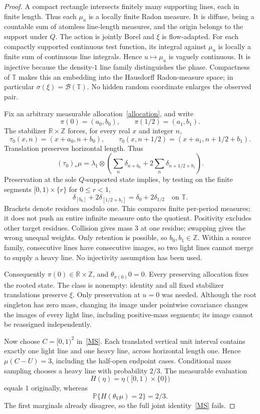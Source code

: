 \documentclass[11pt]{article}
\newcommand{\R}{\mathbb R}
\newcommand{\Z}{\mathbb Z}
\newcommand{\T}{\mathbb T}
\begin{document}
\begin{proof}
A compact rectangle intersects finitely many supporting lines, each in finite length. Thus each $\mu_u$ is a locally finite Radon measure. It is diffuse, being a countable sum of atomless line-length measures, and the origin belongs to the support under $Q$. The action is jointly Borel and $\xi$ is flow-adapted. For each compactly supported continuous test function, its integral against $\mu_u$ is locally a finite sum of continuous line integrals. Hence $u\mapsto\mu_u$ is vaguely continuous. It is injective because the density-$1$ line family distinguishes the phase. Compactness of $\T$ makes this an embedding into the Hausdorff Radon-measure space; in particular $\sigma(\xi)=\mathcal B(\T)$. No hidden random coordinate enlarges the observed pair.

Fix an arbitrary measurable allocation~\eqref{allocation}, and write
\[
 \pi(0)=(a_0,b_0),\qquad \pi(1/2)=(a_1,b_1).
\]
The stabilizer $\R\times\Z$ forces, for every real $x$ and integer $n$,
\[
 \tau_0(x,n)=(x+a_0,n+b_0),\qquad
 \tau_0(x,n+1/2)=(x+a_1,n+1/2+b_1).
\]
Translation preserves horizontal length. Thus
\[
 (\tau_0)_*\mu=\lambda_1\otimes
 \left(\sum_n\delta_{n+b_0}+2\sum_n\delta_{n+1/2+b_1}\right).
\]
Preservation at the sole $Q$-supported state implies, by testing on the finite segments $[0,1)\times\{r\}$ for $0\le r<1$,
\begin{equation}\label{quotient}
 \delta_{[b_0]}+2\delta_{[1/2+b_1]}
   =\delta_0+2\delta_{1/2}\quad\text{on }\T.
\end{equation}
Brackets denote residues modulo one. This compares finite per-period measures; it does not push an entire infinite measure onto the quotient. Positivity excludes other target residues. Collision gives mass $3$ at one residue; swapping gives the wrong unequal weights. Only retention is possible, so $b_0,b_1\in\Z$. Within a source family, consecutive lines have consecutive images, so two light lines cannot merge to supply a heavy line. No injectivity assumption has been used.

Consequently $\pi(0)\in\R\times\Z$, and $\theta_{\pi(0)}0=0$. Every preserving allocation fixes the rooted state. The class is nonempty: identity and all fixed stabilizer translations preserve $\xi$. Only preservation at $u=0$ was needed. Although the root singleton has zero mass, changing its image under pointwise covariance changes the images of every light line, including positive-mass segments; its image cannot be reassigned independently.

Now choose $C=[0,1)^2$ in~\eqref{MS}. Each translated vertical unit interval contains exactly one light line and one heavy line, across horizontal length one. Hence $\mu(C-U)=3$, including the half-open endpoint cases. Conditional mass sampling chooses a heavy line with probability $2/3$. The measurable evaluation
\[
 H(\eta)=\eta([0,1)\times\{0\})
\]
equals $1$ originally, whereas
\[
 \mathbb P\{H(\theta_V\mu)=2\}=2/3.
\]
The first marginals already disagree, so the full joint identity~\eqref{MS} fails.
\end{proof}
\end{document}
